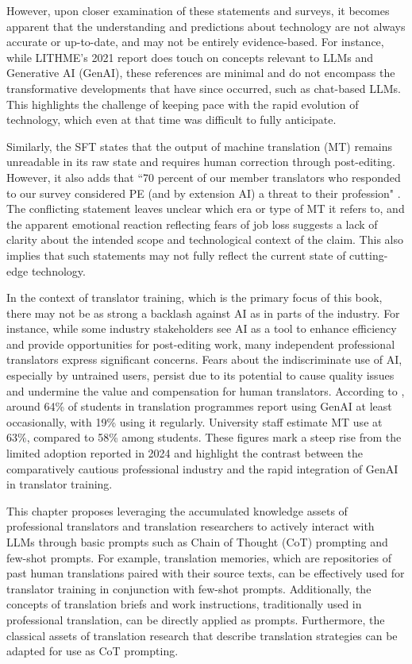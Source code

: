 \documentclass[output=paper,colorlinks,citecolor=brown, japanesefont]{langscibook}
\begin{document}
However, upon closer examination of these statements and surveys, it becomes apparent that the understanding and predictions about technology are not always accurate or up-to-date, and may not be entirely evidence-based. For instance, while LITHME’s 2021 report \citep{Sayers2021} does touch on concepts relevant to LLMs and Generative AI (GenAI), these references are minimal and do not encompass the transformative developments that have since occurred, such as chat-based LLMs. This highlights the challenge of keeping pace with the rapid evolution of technology, which even at that time was difficult to fully anticipate.

Similarly, the SFT states that the output of machine translation (MT) remains unreadable in its raw state and requires human correction through post-editing. However, it also adds that ``70 percent of our member translators who responded to our survey considered PE (and by extension AI) a threat to their profession" \citep{Slator2024}. The conflicting statement leaves unclear which era or type of MT it refers to, and the apparent emotional reaction reflecting fears of job loss suggests a lack of clarity about the intended scope and technological context of the claim. This also implies that such statements may not fully reflect the current state of cutting-edge technology.

In the context of translator training, which is the primary focus of this book, there may not be as strong a backlash against AI as in parts of the industry. For instance, while some industry stakeholders see AI as a tool to enhance efficiency and provide opportunities for post-editing work, many independent professional translators express significant concerns. Fears about the indiscriminate use of AI, especially by untrained users, persist due to its potential to cause quality issues and undermine the value and compensation for human translators. According to \citet{elis_elis_2025}, around 64\% of students in translation programmes report using GenAI at least occasionally, with 19\% using it regularly. University staff estimate MT use at 63\%, compared to 58\% among students. These figures mark a steep rise from the limited adoption reported in 2024 and highlight the contrast between the comparatively cautious professional industry and the rapid integration of GenAI in translator training.

\sloppy
This chapter proposes leveraging the accumulated knowledge assets of professional translators and translation researchers to actively interact with LLMs through basic prompts such as Chain of Thought (CoT) prompting and few-shot prompts. For example, translation memories, which are repositories of past human translations paired with their source texts, can be effectively used for translator training in conjunction with few-shot prompts. Additionally, the concepts of translation briefs and work instructions, traditionally used in professional translation, can be directly applied as prompts. Furthermore, the classical assets of translation research that describe translation strategies can be adapted for use as CoT prompting. 
\end{document}
